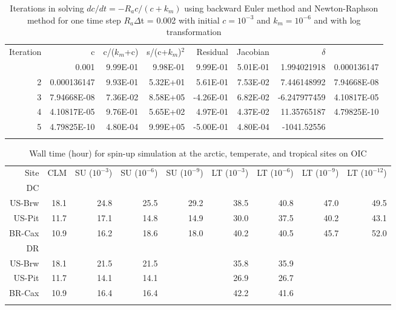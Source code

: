\documentclass[gmd, manuscript]{copernicus}
\begin{document}
\begin{table}[t]
\caption{Iterations in solving $dc/dt=-R_ac/(c+k_m)$ using backward Euler method
and Newton-Raphson method for one time step $R_a\Delta$t = 0.002 with
initial $c=10^{-3}$ and $k_m=10^{-6}$ and with log transformation}
\label{table4}
\begin{tabular}{rrrrrrrr}
\tophline
Iteration& c &	c/($k_m$+c)& s/(c+$k_m$)$^2$ & Residual	& Jacobian & $\delta$ \\
\middlehline
1 & 0.001 & 9.99E-01 & 9.98E-01 & 9.99E-01 & 5.01E-01 & 1.994021918 & 0.000136147 \\
2 & 0.000136147 & 9.93E-01 & 5.32E+01 & 5.61E-01 & 7.53E-02 & 7.446148992 & 7.94668E-08 \\
3 & 7.94668E-08 & 7.36E-02 & 8.58E+05 & -4.26E-01 & 6.82E-02 & -6.247977459 & 4.10817E-05 \\
4 & 4.10817E-05 & 9.76E-01 & 5.65E+02 &	4.97E-01 & 4.37E-02 & 11.35765187 & 4.79825E-10 \\
5 & 4.79825E-10 & 4.80E-04 & 9.99E+05 & -5.00E-01 & 4.80E-04 & -1041.52556 &  \\
\bottomhline
\end{tabular}
\end{table}

\begin{table}[t]
\caption{Wall time (hour) for spin-up simulation at the arctic, temperate, and tropical sites on OIC}
\label{tab:computingtime}
\begin{tabular}{rrrrrrrrr}
\tophline
Site & CLM  & SU ($10^{-3}$) & SU ($10^{-6}$) & SU ($10^{-9}$) & LT ($10^{-3}$) & LT ($10^{-6}$) & LT ($10^{-9}$) & LT ($10^{-12}$)\\
DC\\
US-Brw & 18.1 & 24.8 & 25.5 & 29.2 & 38.5 & 40.8 & 47.0 & 49.5 \\
US-Pit & 11.7 & 17.1 & 14.8 & 14.9 & 30.0 & 37.5 & 40.2 & 43.1 \\
BR-Cax & 10.9 & 16.2 & 18.6 & 18.0 & 40.2 & 40.5 & 45.7 & 52.0 \\
\middlehline
DR\\
US-Brw & 18.1 & 21.5 & 21.5 &      & 35.8 & 35.9 & \\
US-Pit & 11.7 & 14.1 & 14.1 &      & 26.9 & 26.7 & \\
BR-Cax & 10.9 & 16.4 & 16.4 &      & 42.2 & 41.6 & \\
\bottomhline
\end{tabular}
\end{table}
\end{document}
